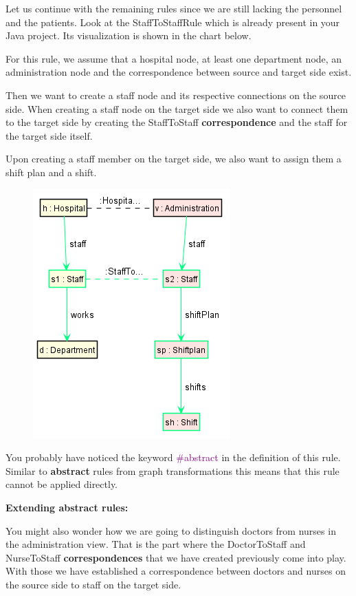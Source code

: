 Let us continue with the remaining rules since we are still lacking the personnel and the patients. Look at the \textsf{StaffToStaffRule} which is already present in your Java project. Its visualization is shown in the chart below.

For this rule, we assume that a hospital node, at least one department node, an administration node and the correspondence between source and target side exist.

Then we want to create a staff node and its respective connections on the source side. When creating a staff node on the target side we also want to connect them to the target side by creating the \textsf{StaffToStaff} \textbf{correspondence} and the staff for the target side itself.

Upon creating a staff member on the target side, we also want to assign them a shift plan and a shift.

\begin{figure}[h]
    \centering
    \includegraphics[scale=0.6 ]{pictures/StaffToStaffRule.png}
    \caption{}
    \label{TGG rule creation}
\end{figure}

You probably have noticed the keyword \textcolor{Purple}{\#abstract} in the definition of this rule. Similar to \textbf{abstract} rules from graph transformations this means that this rule cannot be applied directly.\newline

\textbf{Extending abstract rules:}

You might also wonder how we are going to distinguish doctors from nurses in the administration view. That is the part where the \textsf{DoctorToStaff} and \textsf{NurseToStaff} \textbf{correspondences} that we have created previously come into play. With those we have established a correspondence between doctors and nurses on the source side to staff on the target side.

